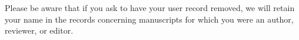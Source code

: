 \documentclass{article}
\begin{document}
Please be aware that if you ask to have your user record removed, we will retain your name in the records concerning manuscripts for which you were an author, reviewer, or editor.

 

\end{document}
